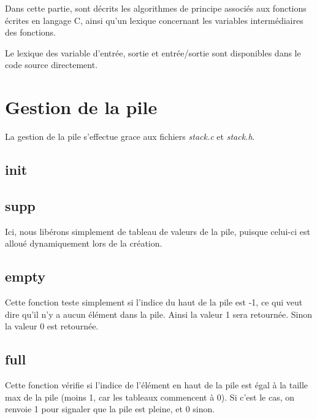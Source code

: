 Dans cette partie, sont décrits les algorithmes de principe associés aux fonctions écrites en langage C, ainsi qu'un lexique concernant les variables intermédiaires des fonctions.

Le lexique des variable d'entrée, sortie et entrée/sortie sont disponibles dans le code source directement.

\section{Gestion de la pile}
  La gestion de la pile s'effectue grace aux fichiers \textit{stack.c} et \textit{stack.h}.
  
  \subsection{init}
      \begin{algo}[informal] %
      \BEGIN
        \ENDIF
      \END
    \end{algo}

    \begin{algo}[informal] %
      \VAR
      \ENDVAR
    \end{algo}

  \subsection{supp}
    Ici, nous libérons simplement de tableau de valeurs de la pile, puisque celui-ci est alloué dynamiquement lors de la création.
  
  \subsection{empty}
    Cette fonction teste simplement si l'indice du haut de la pile est -1, ce qui veut dire qu'il n'y a aucun élément dans la pile. Ainsi la valeur 1 sera retournée. Sinon la valeur 0 est retournée.
  
  \subsection{full}
    Cette fonction vérifie si l'indice de l'élément en haut de la pile est égal à la taille max de la pile (moins 1, car les tableaux commencent à 0). Si c'est le cas, on renvoie 1 pour signaler que la pile est pleine, et 0 sinon.
  

